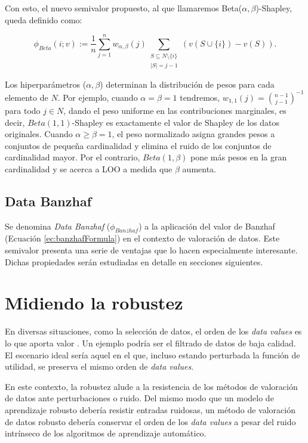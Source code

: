 Con esto, el nuevo semivalor propuesto, al que llamaremos
Beta($\alpha, \beta$)-Shapley, queda definido como:

\begin{equation*}
  \label{eq:betaShapley}
  \phi_{Beta}(i;v) := \frac{1}{n} \sum_{j=1}^{n} 
  w_{\alpha, \beta}(j) \sum_{\substack{S \subseteq N \setminus \{i\}
  \\ |S|=j-1}}
  (v(S \cup \{i\})-v(S)).
\end{equation*}

Los hiperparámetros ($\alpha, \beta$) determinan la
distribución de pesos para cada elemento de $N$.
Por ejemplo, cuando $\alpha = \beta = 1$ tendremos,
$w_{1,1}(j) = \binom{n-1}{j-1}^{-1}$ para todo $j \in N$,
dando el peso uniforme en las contribuciones marginales,
es decir, $Beta(1,1)$-Shapley es exactamente
el valor de Shapley de los datos originales.
Cuando $\alpha \geq \beta = 1$, el peso normalizado asigna
grandes pesos a conjuntos de pequeña cardinalidad y elimina
el ruido de los conjuntos de cardinalidad mayor.
Por el contrario, $Beta(1,\beta)$ pone más pesos en
la gran cardinalidad y se acerca a LOO a medida que $\beta$
aumenta.

\subsection*{Data Banzhaf}
Se denomina \textit{Data Banzhaf} ($\phi_{Banzhaf}$)
 a la aplicación del valor de
Banzhaf (Ecuación \ref{ec:banzhafFormula}) en el
contexto de valoración de datos. Este semivalor presenta una
serie de ventajas que lo hacen especialmente interesante. Dichas
propiedades serán estudiadas en detalle en secciones
siguientes. 

\newpage
\section{Midiendo la robustez}

En diversas situaciones, como la selección de datos, el orden
de los \textit{data values} es lo que aporta valor \cite{betaShapley}.
Un ejemplo podría ser el filtrado de datos de baja calidad.
El escenario ideal sería aquel en el que, incluso
estando perturbada la función de utilidad, se preserva
el mismo orden de \textit{data values}.

En este contexto, la robustez alude a la resistencia
de los métodos de valoración de datos ante perturbaciones
o ruido. Del mismo modo que un modelo de aprendizaje robusto
debería resistir entradas ruidosas, un método de valoración de
datos robusto debería conservar el orden de los \textit{data values} a pesar
del ruido intrínseco de los algoritmos
de aprendizaje automático.


